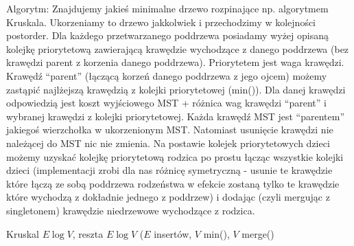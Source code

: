 \documentclass[a4paper,12pt]{article}
\begin{document}
Algorytm:
Znajdujemy jakieś minimalne drzewo rozpinające np. algorytmem Kruskala. Ukorzeniamy to drzewo jakkolwiek i przechodzimy w kolejności postorder. Dla każdego przetwarzanego poddrzewa posiadamy wyżej opisaną kolejkę priorytetową zawierającą krawędzie wychodzące z danego poddrzewa (bez krawędzi parent z korzenia danego poddrzewa). Priorytetem jest waga krawędzi. Krawędź ``parent'' (łączącą korzeń danego poddrzewa z jego ojcem) możemy zastąpić najlżejszą krawędzią z kolejki priorytetowej (min()). Dla danej krawędzi odpowiedzią jest koszt wyjściowego MST + różnica wag krawędzi ``parent'' i wybranej krawędzi z kolejki priorytetowej. Każda krawędź MST jest ``parentem'' jakiegoś wierzchołka w ukorzenionym MST. Natomiast usunięcie krawędzi nie należącej do MST nic nie zmienia. Na postawie kolejek priorytetowych dzieci możemy uzyskać kolejkę priorytetową rodzica po prostu łącząc wszystkie kolejki dzieci (implementacji zrobi dla nas różnicę symetryczną - usunie te krawędzie które łączą ze sobą poddrzewa rodzeństwa w efekcie zostaną tylko te krawędzie które wychodzą z dokładnie jednego z poddrzew) i dodając (czyli mergując z singletonem) krawędzie niedrzewowe wychodzące z rodzica.

Kruskal $E\log{V}$, reszta $E\log{V}$ ($E$ insertów, $V$ min(), $V$ merge()
\end{document}
